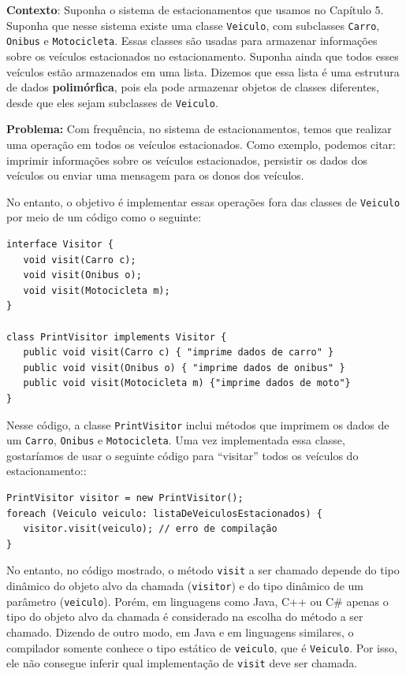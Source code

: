 \documentclass[
  11pt,
  twoside]{book}
\newcommand{\passthrough}[1]{#1}
\begin{document}
\textbf{Contexto}: Suponha o sistema de estacionamentos que usamos no
Capítulo 5. Suponha que nesse sistema existe uma classe
\passthrough{\lstinline!Veiculo!}, com subclasses
\passthrough{\lstinline!Carro!}, \passthrough{\lstinline!Onibus!} e
\passthrough{\lstinline!Motocicleta!}. Essas classes são usadas para
armazenar informações sobre os veículos estacionados no estacionamento.
Suponha ainda que todos esses veículos estão armazenados em uma lista.
Dizemos que essa lista é uma estrutura de dados \textbf{polimórfica},
pois ela pode armazenar objetos de classes diferentes, desde que eles
sejam subclasses de \passthrough{\lstinline!Veiculo!}.

\textbf{Problema:} Com frequência, no sistema de estacionamentos, temos
que realizar uma operação em todos os veículos estacionados. Como
exemplo, podemos citar: imprimir informações sobre os veículos
estacionados, persistir os dados dos veículos ou enviar uma mensagem
para os donos dos veículos.

No entanto, o objetivo é implementar essas operações fora das classes de
\passthrough{\lstinline!Veiculo!} por meio de um código como o seguinte:

\begin{lstlisting}
interface Visitor {
   void visit(Carro c);
   void visit(Onibus o);
   void visit(Motocicleta m);
}  

class PrintVisitor implements Visitor {
   public void visit(Carro c) { "imprime dados de carro" }
   public void visit(Onibus o) { "imprime dados de onibus" }
   public void visit(Motocicleta m) {"imprime dados de moto"}
}
\end{lstlisting}

Nesse código, a classe \passthrough{\lstinline!PrintVisitor!} inclui
métodos que imprimem os dados de um \passthrough{\lstinline!Carro!},
\passthrough{\lstinline!Onibus!} e
\passthrough{\lstinline!Motocicleta!}. Uma vez implementada essa classe,
gostaríamos de usar o seguinte código para ``visitar'' todos os veículos
do estacionamento::

\begin{lstlisting}
PrintVisitor visitor = new PrintVisitor();
foreach (Veiculo veiculo: listaDeVeiculosEstacionados) {
   visitor.visit(veiculo); // erro de compilação
}
\end{lstlisting}

No entanto, no código mostrado, o método \passthrough{\lstinline!visit!}
a ser chamado depende do tipo dinâmico do objeto alvo da chamada
(\passthrough{\lstinline!visitor!}) e do tipo dinâmico de um parâmetro
(\passthrough{\lstinline!veiculo!}). Porém, em linguagens como Java, C++
ou C\# apenas o tipo do objeto alvo da chamada é considerado na escolha
do método a ser chamado. Dizendo de outro modo, em Java e em linguagens
similares, o compilador somente conhece o tipo estático de
\passthrough{\lstinline!veiculo!}, que é
\passthrough{\lstinline!Veiculo!}. Por isso, ele não consegue inferir
qual implementação de \passthrough{\lstinline!visit!} deve ser chamada.
\end{document}
